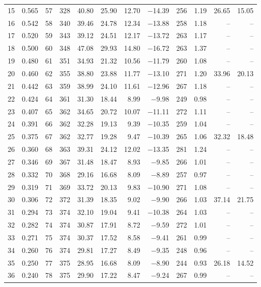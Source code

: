 \begin{table}[H]
\begin{tabular}{rrrrrrrrrrrr}
15 & 0.565 & 57 & 328 & 40.80 & 25.90 & 12.70 & $-$14.39 & 256 & 1.19 & 26.65 & 15.05 \\
16 & 0.542 & 58 & 340 & 39.46 & 24.78 & 12.34 & $-$13.88 & 258 & 1.18 & -- & -- \\
17 & 0.520 & 59 & 343 & 39.12 & 24.51 & 12.17 & $-$13.72 & 263 & 1.17 & -- & -- \\
18 & 0.500 & 60 & 348 & 47.08 & 29.93 & 14.80 & $-$16.72 & 263 & 1.37 & -- & -- \\
19 & 0.480 & 61 & 351 & 34.93 & 21.32 & 10.56 & $-$11.79 & 260 & 1.08 & -- & -- \\
20 & 0.460 & 62 & 355 & 38.80 & 23.88 & 11.77 & $-$13.10 & 271 & 1.20 & 33.96 & 20.13 \\
21 & 0.442 & 63 & 359 & 38.99 & 24.10 & 11.61 & $-$12.96 & 267 & 1.18 & -- & -- \\
22 & 0.424 & 64 & 361 & 31.30 & 18.44 & 8.99 & $-$9.98 & 249 & 0.98 & -- & -- \\
23 & 0.407 & 65 & 362 & 34.65 & 20.72 & 10.07 & $-$11.11 & 272 & 1.11 & -- & -- \\
24 & 0.391 & 66 & 362 & 32.28 & 19.13 & 9.39 & $-$10.35 & 259 & 1.04 & -- & -- \\
25 & 0.375 & 67 & 362 & 32.77 & 19.28 & 9.47 & $-$10.39 & 265 & 1.06 & 32.32 & 18.48 \\
26 & 0.360 & 68 & 363 & 39.31 & 24.12 & 12.02 & $-$13.35 & 281 & 1.24 & -- & -- \\
27 & 0.346 & 69 & 367 & 31.48 & 18.47 & 8.93 & $-$9.85 & 266 & 1.01 & -- & -- \\
28 & 0.332 & 70 & 368 & 29.16 & 16.68 & 8.09 & $-$8.89 & 257 & 0.97 & -- & -- \\
29 & 0.319 & 71 & 369 & 33.72 & 20.13 & 9.83 & $-$10.90 & 271 & 1.08 & -- & -- \\
30 & 0.306 & 72 & 372 & 31.39 & 18.35 & 9.02 & $-$9.90 & 266 & 1.03 & 37.14 & 21.75 \\
31 & 0.294 & 73 & 374 & 32.10 & 19.04 & 9.41 & $-$10.38 & 264 & 1.03 & -- & -- \\
32 & 0.282 & 74 & 374 & 30.87 & 17.91 & 8.72 & $-$9.59 & 272 & 1.01 & -- & -- \\
33 & 0.271 & 75 & 374 & 30.37 & 17.52 & 8.58 & $-$9.41 & 261 & 0.99 & -- & -- \\
34 & 0.260 & 76 & 374 & 29.81 & 17.27 & 8.49 & $-$9.35 & 248 & 0.96 & -- & -- \\
35 & 0.250 & 77 & 375 & 28.95 & 16.68 & 8.09 & $-$8.90 & 244 & 0.93 & 26.18 & 14.52 \\
36 & 0.240 & 78 & 375 & 29.90 & 17.22 & 8.47 & $-$9.24 & 267 & 0.99 & -- & -- \\

\end{tabular}
\end{table}
